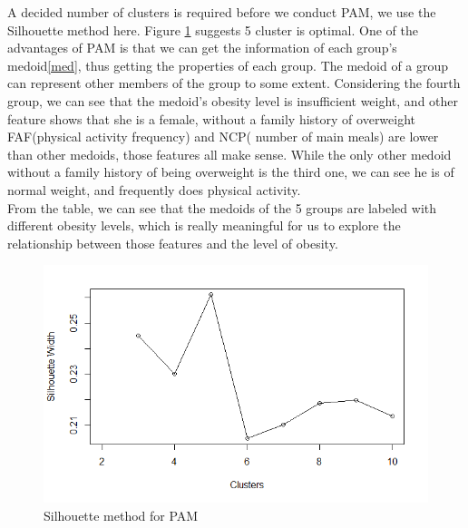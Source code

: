 A decided number of clusters is required before we conduct PAM, we use the Silhouette method here. Figure \ref{sil_pam} suggests 5 cluster is optimal. One of the advantages of PAM is that we can get the information of each group's medoid\ref{med}, thus getting the properties of each group. The medoid of a group can represent other members of the group to some extent. Considering the fourth group, we can see that the medoid's obesity level is insufficient weight, and other feature shows that she is a female, without a family history of overweight FAF(physical activity frequency) and NCP( number of main meals) are lower than other medoids, those features all make sense. While the only other medoid without a family history of being overweight is the third one, we can see he is of normal weight, and frequently does physical activity.\\
From the table, we can see that the medoids of the 5 groups are labeled with different obesity levels, which is really meaningful for us to explore the relationship between those features and the level of obesity.
\begin{figure}
    \centering
    \includegraphics[width=1\linewidth]{image/shi_pam.png}
    \caption{Silhouette method for PAM}
    \label{sil_pam}
\end{figure}

